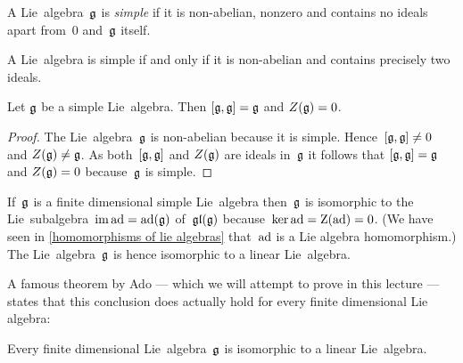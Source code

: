 \begin{definition}
 A Lie~algebra~$\mathfrak{g}$ is \emph{simple} if it is non-abelian, nonzero and contains no ideals apart from~$0$ and~$\mathfrak{g}$ itself.
\end{definition}


\begin{remark}
  A Lie~algebra is simple if and only if it is non-abelian and contains precisely two ideals.
\end{remark}


\begin{lemma}
 Let $\mathfrak{g}$ be a simple Lie~algebra.
 Then $[\mathfrak{g}, \mathfrak{g}] = \mathfrak{g}$ and $Z(\mathfrak{g}) = 0$.
\end{lemma}


\begin{proof}
 The Lie~algebra~$\mathfrak{g}$ is non-abelian because it is simple.
 Hence~$[\mathfrak{g}, \mathfrak{g}] \neq 0$ and $Z(\mathfrak{g}) \neq \mathfrak{g}$.
 As both~$[\mathfrak{g}, \mathfrak{g}]$ and $Z(\mathfrak{g})$ are ideals in~$\mathfrak{g}$ it follows that $[\mathfrak{g}, \mathfrak{g}] = \mathfrak{g}$ and $Z(\mathfrak{g}) = 0$ because~$\mathfrak{g}$ is simple.
\end{proof}


\begin{remark}
  If~$\mathfrak{g}$ is a finite dimensional simple Lie~algebra then~$\mathfrak{g}$ is isomorphic to the Lie~subalgebra~$\operatorname{im} \operatorname{ad} = \operatorname{ad}(\mathfrak{g})$ of~$\mathfrak{gl}(\mathfrak{g})$ because~$\ker \operatorname{ad} = \operatorname{Z}(\operatorname{ad}) = 0$.
  (We have seen in \cref{homomorphisms of lie algebras} that~$\operatorname{ad}$ is a Lie algebra homomorphism.)
  The Lie~algebra~$\mathfrak{g}$ is hence isomorphic to a linear Lie~algebra.
  
  A famous theorem by Ado --- which we will attempt to prove in this lecture --- states that this conclusion does actually hold for every finite dimensional Lie algebra:
\end{remark}


\begin{theorem}[Ado]
  Every finite dimensional Lie~algebra~$\mathfrak{g}$ is isomorphic to a linear Lie~algebra.
\end{theorem}


